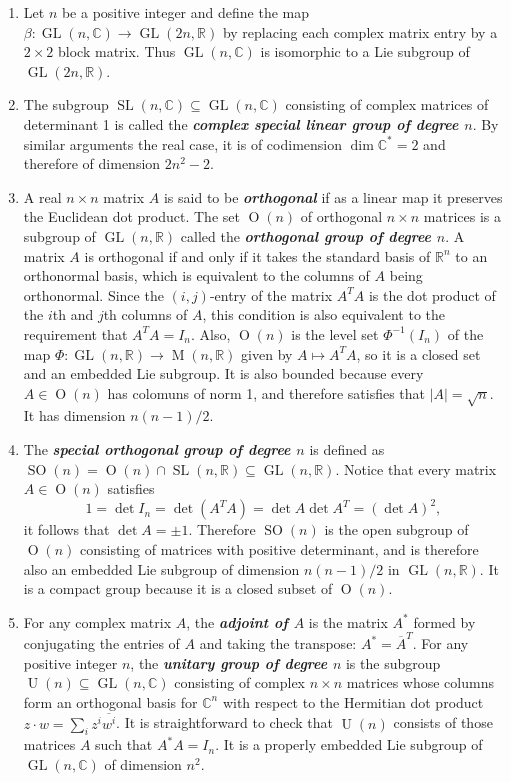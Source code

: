 \documentclass{article}
\numberwithin{equation}{section}
\newcommand{\R}{\mathbb{R}}
\newcommand{\C}{\mathbb{C}}
\renewcommand{\O}{\operatorname{O}}
\DeclareMathOperator{\GL}{GL}
\DeclareMathOperator{\SL}{SL}
\DeclareMathOperator{\SO}{SO}
\DeclareMathOperator{\U}{U}
\begin{document}
\begin{example}
\begin{enumerate}
		\item Let $n$ be a positive integer and define the map $\beta:\GL(n,\C)\to\GL(2n,\R)$ by replacing each complex matrix entry by a $2\times 2$ block matrix. Thus $\GL(n,\C)$ is isomorphic to a Lie subgroup of $\GL(2n,\R)$.
		\item The subgroup $\SL(n,\C)\subseteq\GL(n,\C)$ consisting of complex matrices of determinant 1 is called the \textbf{\textit{complex special linear group of degree $n$}}. By similar arguments the real case, it is of codimension $\dim\C^*=2$ and therefore of dimension $2n^2-2$.
		\item A real $n\times n$ matrix $A$ is said to be \textbf{\textit{orthogonal}} if as a linear map it preserves the Euclidean dot product. The set $\O(n)$ of orthogonal $n\times n$ matrices is a subgroup of $\GL(n,\R)$ called the \textbf{\textit{orthogonal group of degree $n$}}. A matrix $A$ is orthogonal if and only if it takes the standard basis of $\R^n$ to an orthonormal basis, which is equivalent to the columns of $A$ being orthonormal. Since the $(i,j)$-entry of the matrix $A^TA$ is the dot product of the $i$th and $j$th columns of $A$, this condition is also equivalent to the requirement that $A^TA=I_n$. Also, $\O(n)$ is the level set $\Phi^{-1}(I_n)$ of the map $\Phi:\GL(n,\R)\to\operatorname{M}(n,\R)$ given by $A\mapsto A^TA$, so it is a closed set and an embedded Lie subgroup. It is also bounded because every $A\in\O(n)$ has colomuns of norm 1, and therefore satisfies that $|A|=\sqrt{n}$. It has dimension $n(n-1)/2$.
		\item The \textbf{\textit{special orthogonal group of degree $n$}} is defined as $\SO(n)=\O(n)\cap\SL(n,\R)\subseteq\GL(n,\R)$. Notice that every matrix $A\in\O(n)$ satisfies
		\[1=\det I_n=\det(A^TA)=\det A\det A^T=(\det A)^2,\]
		it follows that $\det A=\pm1$. Therefore $\SO(n)$ is the open subgroup of $\O(n)$ consisting of matrices with positive determinant, and is therefore also an embedded Lie subgroup of dimension $n(n-1)/2$ in $\GL(n,\R)$. It is a compact group because it is a closed subset of $\O(n)$.
		\item For any complex matrix $A$, the \textbf{\textit{adjoint of $A$}} is the matrix $A^*$ formed by conjugating the entries of $A$ and taking the transpose: $A^*=\overline{A}^T$. For any positive integer $n$, the \textbf{\textit{unitary group of degree $n$}} is the subgroup $\U(n)\subseteq\GL(n,\C)$ consisting of complex $n\times n$ matrices whose columns form an orthogonal basis for $\C^n$ with respect to the Hermitian dot product $z\cdot w=\sum_iz^i\overline{w^i}$. It is straightforward to check that $\U(n)$ consists of those matrices $A$ such that $A^*A=I_n$. It is a properly embedded Lie subgroup of $\GL(n,\C)$ of dimension $n^2$.

\end{enumerate}
\end{example}
\end{document}
